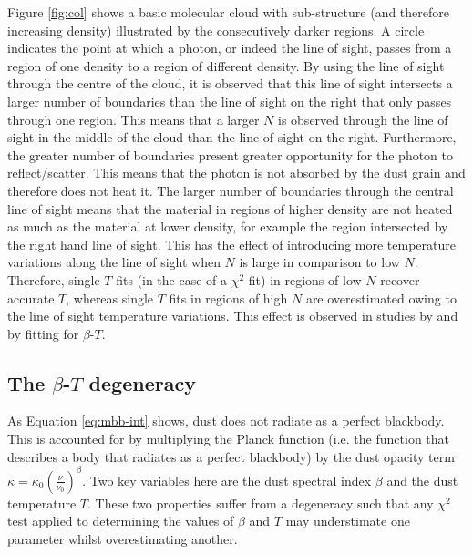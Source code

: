 \documentclass{report}
\begin{document}
Figure \ref{fig:col} shows a basic molecular cloud with sub-structure (and therefore increasing density) illustrated by the consecutively darker regions. A circle indicates the point at which a photon, or indeed the line of sight, passes from a region of one density to a region of different density. By using the line of sight through the centre of the cloud, it is observed that this line of sight intersects a larger number of boundaries than the line of sight on the right that only passes through one region. This means that a larger $N$ is observed through the line of sight in the middle of the cloud than the line of sight on the right. Furthermore, the greater number of boundaries present greater opportunity for the photon to reflect/scatter. This means that the photon is not absorbed by the dust grain and therefore does not heat it. The larger number of boundaries through the central line of sight means that the material in regions of higher density are not heated as much as the material at lower density, for example the region intersected by the right hand line of sight. This has the effect of introducing more temperature variations along the line of sight when $N$ is large in comparison to low $N$. Therefore, single $T$ fits (in the case of a $\chi^{2}$ fit) in regions of low $N$ recover accurate $T$, whereas single $T$ fits in regions of high $N$ are overestimated owing to the line of sight temperature variations. This effect is observed in studies by \textcite{noise,noiseb} and \textcite{kelly} by fitting for $\beta$-$T$.

\subsection{The $\beta$-$T$ degeneracy} \label{sec:degen}
As Equation \ref{eq:mbb-int} shows, dust does not radiate as a perfect blackbody. This is accounted for by multiplying the Planck function (i.e. the function that describes a body that radiates as a perfect blackbody) by the dust opacity term $\kappa = \kappa_{0}(\frac{\nu}{\nu_{0}})^{\beta}$. Two key variables here are the dust spectral index $\beta$ and the dust temperature $T$. These two properties suffer from a degeneracy \parencite{degen} such that any $\chi^{2}$ test applied to determining the values of $\beta$ and $T$ may understimate one parameter whilst overestimating another.
\end{document}
